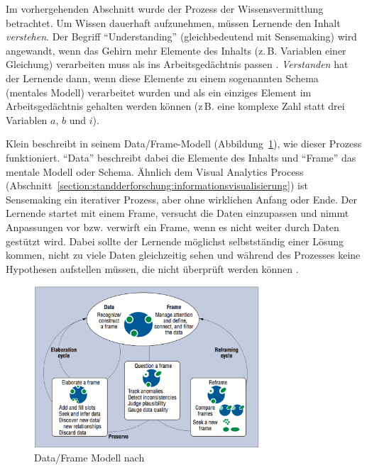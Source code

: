 \documentclass[
	headsepline,
	footsepline,
	fontsize=12pt,
	bibliography=totoc
]{scrbook}
\begin{document}
Im vorhergehenden Abschnitt wurde der Prozess der Wissensvermittlung betrachtet. Um Wissen dauerhaft aufzunehmen, müssen Lernende den Inhalt \emph{verstehen}. Der Begriff \enquote{Understanding} (gleichbedeutend mit Sensemaking) wird angewandt, wenn das Gehirn mehr Elemente des Inhalts (z.\,B. Variablen einer Gleichung) verarbeiten muss als ins Arbeitsgedächtnis passen \cite{Sweller1998}. \emph{Verstanden} hat der Lernende dann, wenn diese Elemente zu einem sogenannten Schema (mentales Modell) verarbeitet wurden und als ein einziges Element im Arbeitsgedächtnis gehalten werden können (z\,B. eine komplexe Zahl statt drei Variablen $a$, $b$ und $i$).


Klein \cite{Klein2006a} beschreibt in seinem Data/Frame-Modell (Abbildung~\ref{figure:data_frame_model}), wie dieser Prozess funktioniert. \enquote{Data} beschreibt dabei die Elemente des Inhalts und \enquote{Frame} das mentale Modell oder Schema. Ähnlich dem Visual Analytics Process (Abschnitt~\ref{section:standderforschung:informationsvisualisierung}) ist Sensemaking ein iterativer Prozess, aber ohne wirklichen Anfang oder Ende. Der Lernende startet mit einem Frame, versucht die Daten einzupassen und nimmt Anpassungen vor bzw. verwirft ein Frame, wenn es nicht weiter durch Daten gestützt wird. Dabei sollte der Lernende möglichst selbstständig einer Lösung kommen, nicht zu viele Daten gleichzeitig sehen und während des Prozesses keine Hypothesen aufstellen müssen, die nicht überprüft werden können \cite{Klein2006}.

\begin{figure}[htbp]
   \centering
   \includegraphics[width=0.75\textwidth]{images/grundlagen-data_frame_model.png}
   \caption{Data/Frame Modell nach \cite{Klein2006}}
   \label{figure:data_frame_model}
\end{figure}
\end{document}
